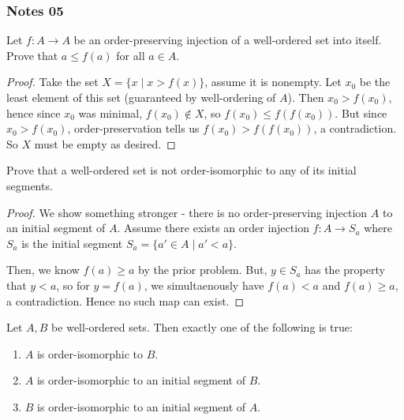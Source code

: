 \documentclass[12pt,letterpaper,reqno]{article}
\begin{document}
\subsubsection{Notes 05}

\begin{lemma}\label{lemma:order-preserving-injections}
    Let $f: A \to A$ be an order-preserving injection of a well-ordered set into itself. Prove that $a \le f(a)$ for all $a \in A$.
\end{lemma}

\begin{proof}
    Take the set $X = \{ x \mid x > f(x) \}$, assume it is nonempty. Let $x_0$ be the least element of this set (guaranteed by well-ordering of $A$). Then $x_0 > f(x_0)$, hence since $x_0$ was minimal, $f(x_0) \notin X$, so $f(x_0) \le f(f(x_0))$. But since $x_0 > f(x_0)$, order-preservation tells us $f(x_0) > f(f(x_0))$, a contradiction. So $X$ must be empty as desired.
\end{proof}

\begin{corollary}\label{corollary:well-ordered-not-iso-initial-segment}
    Prove that a well-ordered set is not order-isomorphic to any of its initial segments.
\end{corollary}

\begin{proof}
    We show something stronger - there is no order-preserving injection $A$ to an initial segment of $A$. Assume there exists an order injection $f: A \to S_{a}$ where $S_{a}$ is the initial segment $S_{a} = \{ a' \in A \mid a' < a \}$. 
    
    Then, we know $f(a) \ge a$ by the prior problem. But, $y \in S_{a}$ has the property that $y < a$, so for $y = f(a)$, we simultaenously have $f(a) < a$ and $f(a) \ge a$, a contradiction. Hence no such map can exist.
\end{proof}

\begin{theorem}\label{theorem:well-ordered-set-isomorphisms}
    Let $A, B$ be well-ordered sets. Then exactly one of the following is true:
    \begin{enumerate}
        \item $A$ is order-isomorphic to $B$.
        \item $A$ is order-isomorphic to an initial segment of $B$.
        \item $B$ is order-isomorphic to an initial segment of $A$.
    \end{enumerate}
\end{theorem}
\end{document}
